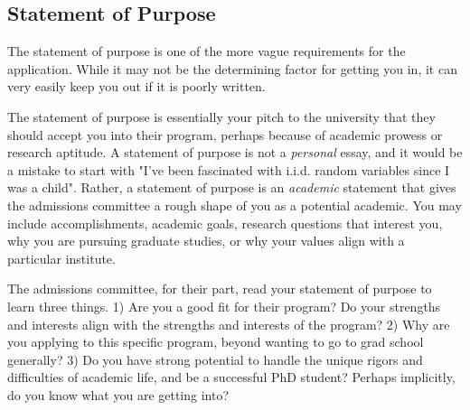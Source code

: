 \documentclass[11pt]{article}
\begin{document}
\subsection{Statement of Purpose}
The statement of purpose is one of the more vague requirements for the application. While it may not be the determining factor for getting you in, it can very easily keep you out if it is poorly written. 

The statement of purpose is essentially your pitch to the university that they should accept you into their program, perhaps because of academic prowess or research aptitude. A statement of purpose is not a \emph{personal} essay, and it would be a mistake to start with "I've been fascinated with i.i.d. random variables since I was a child". Rather, a statement of purpose is an \emph{academic} statement that gives the admissions committee a rough shape of you as a potential academic. You may include accomplishments, academic goals, research questions that interest you, why you are pursuing graduate studies, or why your values align with a particular institute. 

The admissions committee, for their part, read your statement of purpose to learn three things. 1) Are you a good fit for their program? Do your strengths and interests align with the strengths and interests of the program? 2) Why are you applying to this specific program, beyond wanting to go to grad school generally? 3) Do you have strong potential to handle the unique rigors and difficulties of academic life, and be a successful PhD student? Perhaps implicitly, do you know what you are getting into?
\end{document}
